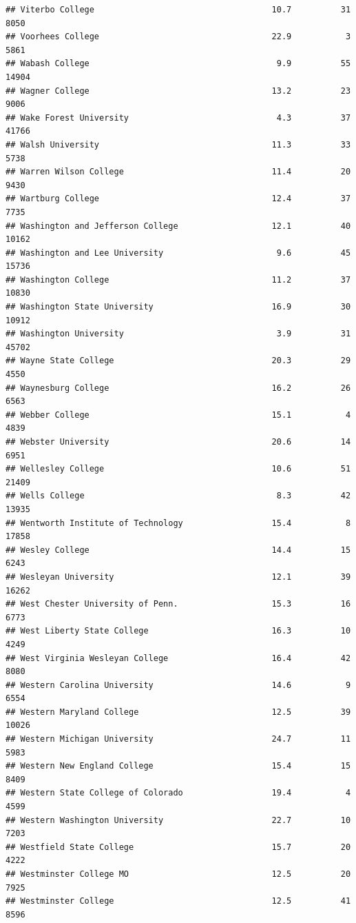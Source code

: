 \documentclass[
]{article}
\begin{document}
\begin{verbatim}
## Viterbo College                                    10.7          31   8050
## Voorhees College                                   22.9           3   5861
## Wabash College                                      9.9          55  14904
## Wagner College                                     13.2          23   9006
## Wake Forest University                              4.3          37  41766
## Walsh University                                   11.3          33   5738
## Warren Wilson College                              11.4          20   9430
## Wartburg College                                   12.4          37   7735
## Washington and Jefferson College                   12.1          40  10162
## Washington and Lee University                       9.6          45  15736
## Washington College                                 11.2          37  10830
## Washington State University                        16.9          30  10912
## Washington University                               3.9          31  45702
## Wayne State College                                20.3          29   4550
## Waynesburg College                                 16.2          26   6563
## Webber College                                     15.1           4   4839
## Webster University                                 20.6          14   6951
## Wellesley College                                  10.6          51  21409
## Wells College                                       8.3          42  13935
## Wentworth Institute of Technology                  15.4           8  17858
## Wesley College                                     14.4          15   6243
## Wesleyan University                                12.1          39  16262
## West Chester University of Penn.                   15.3          16   6773
## West Liberty State College                         16.3          10   4249
## West Virginia Wesleyan College                     16.4          42   8080
## Western Carolina University                        14.6           9   6554
## Western Maryland College                           12.5          39  10026
## Western Michigan University                        24.7          11   5983
## Western New England College                        15.4          15   8409
## Western State College of Colorado                  19.4           4   4599
## Western Washington University                      22.7          10   7203
## Westfield State College                            15.7          20   4222
## Westminster College MO                             12.5          20   7925
## Westminster College                                12.5          41   8596

\end{verbatim}
\end{document}
